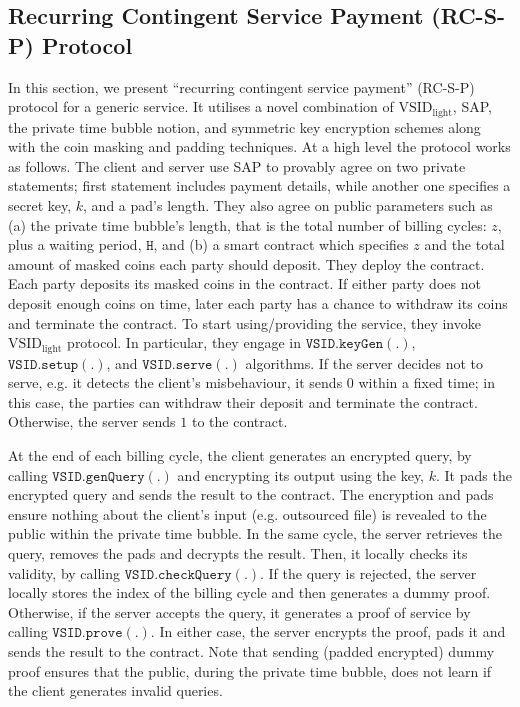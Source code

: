

\subsection{Recurring Contingent Service Payment (RC-S-P) Protocol}\label{sec::RC-S-P-protocol}


 
 
 In this section, we present  ``recurring contingent service payment'' (RC-S-P) protocol for a generic service. It utilises a novel combination of $\text{VSID}_{\scriptscriptstyle\text{light}}$, SAP, the private time bubble notion, and symmetric key encryption schemes along with the coin masking and padding techniques. At a high level the protocol works as follows.  The  client and server use SAP to provably agree on two private statements; first statement includes  payment details, while another one specifies a secret key, $k$, and a pad's length. They also  agree on  public parameters such as (a) the private time bubble's length, that is the total number of billing cycles: $z$, plus a waiting period, $\texttt{H}$, and (b) a smart contract which  specifies $z$ and  the total amount of masked coins each party should deposit. They deploy the contract.  Each party deposits its masked coins in the contract. If either party does not deposit enough coins on time,   later each party has a chance to withdraw its coins and terminate the contract. To start using/providing the service, they invoke $\text{VSID}_{\scriptscriptstyle\text{light}}$ protocol. In particular, they engage in   $\mathtt{VSID.keyGen}(.)$, $\mathtt{VSID.setup}(.)$, and $\mathtt{VSID.serve}(.)$ algorithms. If the server decides not to serve, e.g. it detects the client's misbehaviour,  it sends $0$  within a fixed time; in this case, the parties can withdraw their deposit and terminate the contract. Otherwise, the server sends $1$ to the contract. 
 
 
 
At the end of each billing cycle, the client generates an encrypted query, by calling $\mathtt{VSID.genQuery}(.)$ and encrypting its output using the key, $k$. It pads the encrypted query and  sends the result  to the contract. The encryption and pads ensure  nothing about the client's input (e.g. outsourced file) is revealed to the public within the private time bubble.  In the same cycle, the server retrieves the query, removes the pads and decrypts the result. Then, it locally checks its validity, by calling $\mathtt{VSID.checkQuery}(.)$. If the query is rejected, the server locally stores the index of the billing cycle and then  generates a dummy proof.  Otherwise, if the server accepts the query, it generates a proof of service by calling $\mathtt{VSID.prove}(.)$. In either case, the server encrypts the proof, pads it and sends the result to the contract. Note that sending (padded encrypted) dummy proof ensures that the public, during the private time bubble, does not learn if the client generates invalid queries. 

